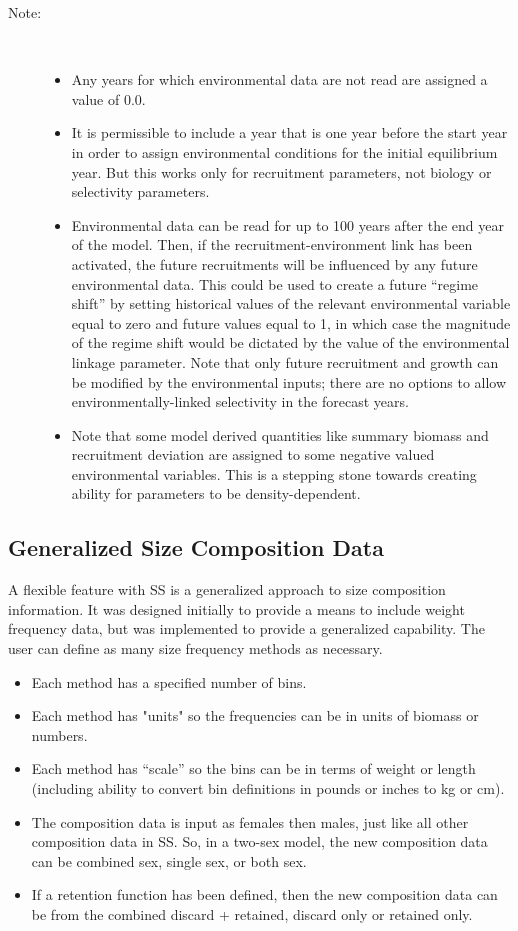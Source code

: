 \begin{description}
	\item[Note:]\
	\begin{itemize}
		\item Any years for which environmental data are not read are assigned a value of 0.0.
		\item It is permissible to include a year that is one year before the start year in order to assign environmental conditions for the initial equilibrium year.  But this works only for recruitment parameters, not biology or selectivity parameters.
		\item Environmental data can be read for up to 100 years after the end year of the model.  Then, if the recruitment-environment link has been activated, the future recruitments will be influenced by any future environmental data.  This could be used to create a future “regime shift” by setting historical values of the relevant environmental variable equal to zero and future values equal to 1, in which case the magnitude of the regime shift would be dictated by the value of the environmental linkage parameter.  Note that only future recruitment and growth can be modified by the environmental inputs; there are no options to allow environmentally-linked selectivity in the forecast years.
		\item Note that some model derived quantities like summary biomass and recruitment deviation are assigned to some negative valued environmental variables.  This is a stepping stone towards creating ability for parameters to be density-dependent.
	\end{itemize}
\end{description}

\subsection{Generalized Size Composition Data}
A flexible feature with SS is a generalized approach to size composition information.  It was designed initially to provide a means to include weight frequency data, but was implemented to provide a generalized capability.  The user can define as many size frequency methods as necessary.

\begin{itemize}
	\item Each method has a specified number of bins.
	\item Each method has "units" so the frequencies can be in units of biomass or numbers.
	\item Each method has “scale” so the bins can be in terms of weight or length (including ability to convert bin definitions in pounds or inches to kg or cm). 
	\item The composition data is input as females then males, just like all other composition data in SS.  So, in a two-sex model, the new composition data can be combined sex, single sex, or both sex.
	\item If a retention function has been defined, then the new composition data can be from the combined discard + retained, discard only or retained only.
\end{itemize}

